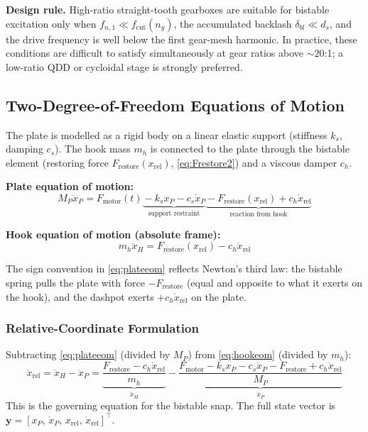 \documentclass[11pt,letterpaper]{article}
\begin{document}
\textbf{Design rule.}  High-ratio straight-tooth gearboxes are suitable for
bistable excitation only when $f_{n,1} \ll f_{\mathrm{cut}}(n_g)$, the
accumulated backlash $\delta_{bl} \ll d_s$, and the drive frequency is well
below the first gear-mesh harmonic.  In practice, these conditions are difficult
to satisfy simultaneously at gear ratios above $\sim 20$:1; a low-ratio QDD
or cycloidal stage is strongly preferred.

\subsection{Two-Degree-of-Freedom Equations of Motion}
\label{ssec:2dof_base}

The plate is modelled as a rigid body on a linear elastic support (stiffness
$k_s$, damping $c_s$). The hook mass $m_h$ is connected to the plate through the
bistable element (restoring force $F_{\mathrm{restore}}(x_{\mathrm{rel}})$,
\cref{eq:Frestore2}) and a viscous damper $c_h$.

\noindent\textbf{Plate equation of motion:}
\begin{equation}
  M_P\ddot{x}_P
  = F_{\mathrm{motor}}(t)
  \underbrace{{}- k_s x_P - c_s\dot{x}_P}_{\text{support restraint}}
  \underbrace{{}- F_{\mathrm{restore}}(x_{\mathrm{rel}}) + c_h\dot{x}_{\mathrm{rel}}}_{\text{reaction from hook}}
  \label{eq:plateeom}
\end{equation}

\noindent\textbf{Hook equation of motion (absolute frame):}
\begin{equation}
  m_h\ddot{x}_H = F_{\mathrm{restore}}(x_{\mathrm{rel}}) - c_h\dot{x}_{\mathrm{rel}}
  \label{eq:hookeom}
\end{equation}

The sign convention in \cref{eq:plateeom} reflects Newton's third law:
the bistable spring pulls the plate with force $-F_{\mathrm{restore}}$ (equal and
opposite to what it exerts on the hook), and the dashpot exerts $+c_h\dot{x}_{\mathrm{rel}}$
on the plate.

\subsubsection{Relative-Coordinate Formulation}

Subtracting \cref{eq:plateeom} (divided by $M_P$) from \cref{eq:hookeom}
(divided by $m_h$):
\begin{equation}
\ddot{x}_{\mathrm{rel}} = \ddot{x}_H - \ddot{x}_P
  = \underbrace{\frac{F_{\mathrm{restore}} - c_h\dot{x}_{\mathrm{rel}}}{m_h}}_{\ddot{x}_H}
  - \underbrace{\frac{F_{\mathrm{motor}} - k_s x_P - c_s\dot{x}_P
      - F_{\mathrm{restore}} + c_h\dot{x}_{\mathrm{rel}}}{M_P}}_{\ddot{x}_P}
  \label{eq:relEOM}
\end{equation}
This is the governing equation for the bistable snap.
The full state vector is $\mathbf{y} = [x_P,\,\dot{x}_P,\,x_{\mathrm{rel}},\,\dot{x}_{\mathrm{rel}}]^\top$.
\end{document}
